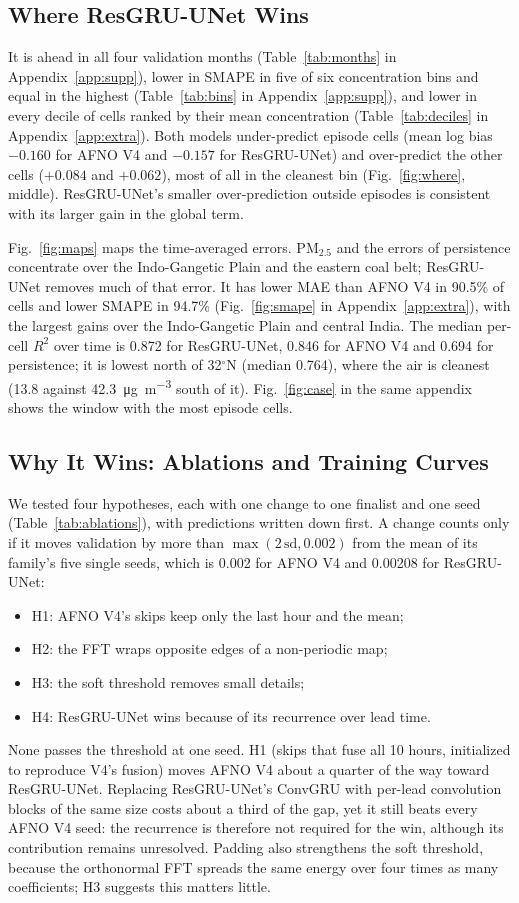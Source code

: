 \documentclass[journal]{IEEEtran}
\newcommand{\ugm}{\si{\micro\gram\per\cubic\metre}}
\newcommand{\PM}{PM$_{2.5}$}
\begin{document}
\subsection{Where ResGRU-UNet Wins}
It is ahead in all four validation months (Table~\ref{tab:months} in Appendix~\ref{app:supp}), lower in SMAPE in five of six concentration bins and equal in the highest (Table~\ref{tab:bins} in Appendix~\ref{app:supp}), and lower in every decile of cells ranked by their mean concentration (Table~\ref{tab:deciles} in Appendix~\ref{app:extra}). Both models under-predict episode cells (mean log bias $-0.160$ for AFNO V4 and $-0.157$ for ResGRU-UNet) and over-predict the other cells ($+0.084$ and $+0.062$), most of all in the cleanest bin (Fig.~\ref{fig:where}, middle). ResGRU-UNet's smaller over-prediction outside episodes is consistent with its larger gain in the global term.

Fig.~\ref{fig:maps} maps the time-averaged errors. \PM{} and the errors of persistence concentrate over the Indo-Gangetic Plain and the eastern coal belt; ResGRU-UNet removes much of that error. It has lower MAE than AFNO V4 in 90.5\% of cells and lower SMAPE in 94.7\% (Fig.~\ref{fig:smape} in Appendix~\ref{app:extra}), with the largest gains over the Indo-Gangetic Plain and central India. The median per-cell $R^2$ over time is 0.872 for ResGRU-UNet, 0.846 for AFNO V4 and 0.694 for persistence; it is lowest north of 32$^\circ$N (median 0.764), where the air is cleanest (13.8 against 42.3~\ugm{} south of it). Fig.~\ref{fig:case} in the same appendix shows the window with the most episode cells.

\subsection{Why It Wins: Ablations and Training Curves}
\label{sec:ablation}
We tested four hypotheses, each with one change to one finalist and one seed (Table~\ref{tab:ablations}), with predictions written down first. A change counts only if it moves validation by more than $\max(2\,\mathrm{sd}, 0.002)$ from the mean of its family's five single seeds, which is 0.002 for AFNO V4 and 0.00208 for ResGRU-UNet:
\begin{itemize}
\item H1: AFNO V4's skips keep only the last hour and the mean;
\item H2: the FFT wraps opposite edges of a non-periodic map;
\item H3: the soft threshold removes small details;
\item H4: ResGRU-UNet wins because of its recurrence over lead time.
\end{itemize}
None passes the threshold at one seed. H1 (skips that fuse all 10 hours, initialized to reproduce V4's fusion) moves AFNO V4 about a quarter of the way toward ResGRU-UNet. Replacing ResGRU-UNet's ConvGRU with per-lead convolution blocks of the same size costs about a third of the gap, yet it still beats every AFNO V4 seed: the recurrence is therefore not required for the win, although its contribution remains unresolved. Padding also strengthens the soft threshold, because the orthonormal FFT spreads the same energy over four times as many coefficients; H3 suggests this matters little.
\end{document}
